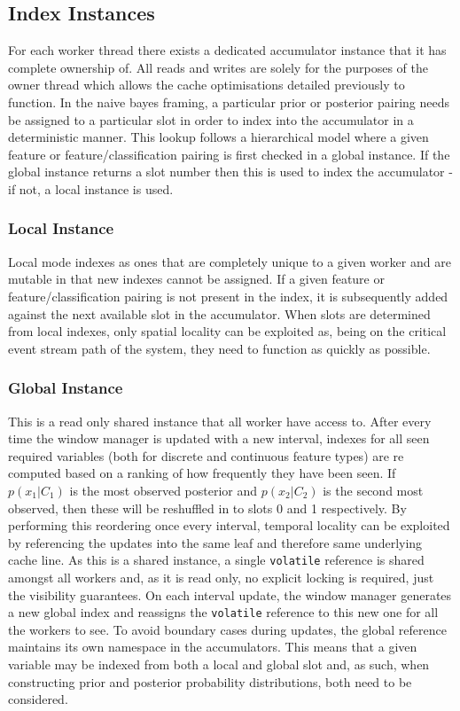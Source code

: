 \documentclass[a4paper,11pt]{scrreprt}
\begin{document}
\subsection{Index Instances}
For each worker thread there exists a dedicated accumulator instance that it has complete ownership of. All reads and writes are solely for the purposes of the owner thread which allows the cache optimisations detailed previously to function. In the naive bayes framing, a particular prior or posterior pairing needs be assigned to a particular slot in order to index into the accumulator in a deterministic manner. This lookup follows a hierarchical model where a given feature or feature/classification pairing is first checked in a global instance. If the global instance returns a slot number then this is used to index the accumulator - if not, a local instance is used.
\subsubsection{Local Instance}
Local mode indexes as ones that are completely unique to a given worker and are mutable in that new indexes cannot be assigned. If a given feature or feature/classification pairing is not present in the index, it is subsequently added against the next available slot in the accumulator. When slots are determined from local indexes, only spatial locality can be exploited as, being on the critical event stream path of the system, they need to function as quickly as possible.
\subsubsection{Global Instance}
This is a read only shared instance that all worker have access to. After every time the window manager is updated with a new interval, indexes for all seen required variables (both for discrete and continuous feature types) are re computed based on a ranking of how frequently they have been seen. If \(p(x_1 | C_1)\) is the most observed posterior and \(p(x_2 | C_2)\) is the second most observed, then these will be reshuffled in to slots 0 and 1 respectively. By performing this reordering once every interval, temporal locality can be exploited by referencing the updates into the same leaf and therefore same underlying cache line. As this is a shared instance, a single \texttt{volatile} reference is shared amongst all workers and, as it is read only, no explicit locking is required, just the visibility guarantees. On each interval update, the window manager generates a new global index and reassigns the \texttt{volatile} reference to this new one for all the workers to see. To avoid boundary cases during updates, the global reference maintains its own namespace in the accumulators. This means that a given variable may be indexed from both a local and global slot and, as such, when constructing prior and posterior probability distributions, both need to be considered.
\end{document}
